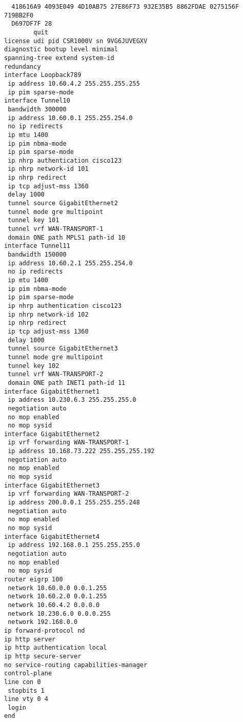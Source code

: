 \begin{lstlisting}
  418616A9 4093E049 4D10AB75 27E86F73 932E35B5 8862FDAE 0275156F 719BB2F0
  D697DF7F 28
        quit
license udi pid CSR1000V sn 9VG6JUVEGXV
diagnostic bootup level minimal
spanning-tree extend system-id
redundancy
interface Loopback789
 ip address 10.60.4.2 255.255.255.255
 ip pim sparse-mode
interface Tunnel10
 bandwidth 300000
 ip address 10.60.0.1 255.255.254.0
 no ip redirects
 ip mtu 1400
 ip pim nbma-mode
 ip pim sparse-mode
 ip nhrp authentication cisco123
 ip nhrp network-id 101
 ip nhrp redirect
 ip tcp adjust-mss 1360
 delay 1000
 tunnel source GigabitEthernet2
 tunnel mode gre multipoint
 tunnel key 101
 tunnel vrf WAN-TRANSPORT-1
 domain ONE path MPLS1 path-id 10
interface Tunnel11
 bandwidth 150000
 ip address 10.60.2.1 255.255.254.0
 no ip redirects
 ip mtu 1400
 ip pim nbma-mode
 ip pim sparse-mode
 ip nhrp authentication cisco123
 ip nhrp network-id 102
 ip nhrp redirect
 ip tcp adjust-mss 1360
 delay 1000
 tunnel source GigabitEthernet3
 tunnel mode gre multipoint
 tunnel key 102
 tunnel vrf WAN-TRANSPORT-2
 domain ONE path INET1 path-id 11
interface GigabitEthernet1
 ip address 10.230.6.3 255.255.255.0
 negotiation auto
 no mop enabled
 no mop sysid
interface GigabitEthernet2
 ip vrf forwarding WAN-TRANSPORT-1
 ip address 10.168.73.222 255.255.255.192
 negotiation auto
 no mop enabled
 no mop sysid
interface GigabitEthernet3
 ip vrf forwarding WAN-TRANSPORT-2
 ip address 200.0.0.1 255.255.255.248
 negotiation auto
 no mop enabled
 no mop sysid
interface GigabitEthernet4
 ip address 192.168.0.1 255.255.255.0
 negotiation auto
 no mop enabled
 no mop sysid
router eigrp 100
 network 10.60.0.0 0.0.1.255
 network 10.60.2.0 0.0.1.255
 network 10.60.4.2 0.0.0.0
 network 10.230.6.0 0.0.0.255
 network 192.168.0.0
ip forward-protocol nd
ip http server
ip http authentication local
ip http secure-server
no service-routing capabilities-manager
control-plane
line con 0
 stopbits 1
line vty 0 4
 login
end
\end{lstlisting}
